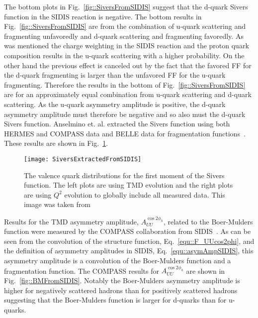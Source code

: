 The bottom plots in Fig.~\ref{fig::SiversFromSIDIS} suggest that the d-quark
Sivers function in the SIDIS reaction is negative.  The bottom results in
Fig.~\ref{fig::SiversFromSIDIS} are from the combination of u-quark scattering
and fragmenting unfavoredly and d-quark scattering and fragmenting favoredly.
As was mentioned the charge weighting in the SIDIS reaction and the proton quark
composition results in the u-quark scattering with a higher probability.  On the
other hand the previous effect is canceled out by the fact that the favored FF
for the d-quark fragmenting is larger than the unfavored FF for the u-quark
fragmenting.  Therefore the results in the bottom of
Fig.~\ref{fig::SiversFromSIDIS} are for an approximately equal combination from
u-quark scattering and d-quark scattering.  As the u-quark asymmetry amplitude
is positive, the d-quark asymmetry amplitude must therefore be negative and so
also must the d-quark Sivers function.  Anselmino et. al. extracted the Sivers
function using both HERMES and COMPASS data and BELLE data for
fragmentation functions~\cite{PhysRevD.86.014028}.  These results are shown in
Fig.~\ref{fig::SiversExtractedFromSIDIS}.

\begin{figure}[h!t]
  \centering \texttt{[image: SiversExtractedFromSIDIS]}
  \caption{The valence quark distributions for the first moment of the Sivers
    function.  The left plots are using TMD evolution and the right plots are
    using $Q^2$ evolution to globally include all measured data.  This image was
    taken from~\cite{PhysRevD.86.014028}}
  \label{fig::SiversExtractedFromSIDIS}
\end{figure}

Results for the TMD asymmetry amplitude, $A_{UU}^{\cos 2\phi_h}$, related to the
Boer-Mulders function were measured by the COMPASS collaboration from
SIDIS~\cite{Adolph:2014pwc}.  As can be seen from the convolution of the
structure function, Eq.~\ref{equ::F_UUcos2phi}, and the definition of asymmetry
amplitudes in SIDIS, Eq.~\ref{equ::asymAmpSIDIS}, this asymmetry amplitude is a
convolution of the Boer-Mulders function and a fragmentation function.  The
COMPASS results for $A_{UU}^{\cos 2\phi_h}$ are shown in
Fig.~\ref{fig::BMFromSIDIS}.  Notably the Boer-Mulders asymmetry amplitude is
higher for negatively scattered hadrons than for positively scattered hadrons
suggesting that the Boer-Mulders function is larger for d-quarks than for
u-quarks.

